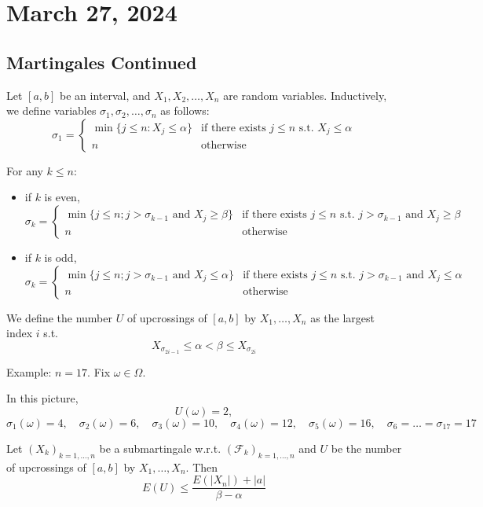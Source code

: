 \section{March 27, 2024}
\subsection{Martingales Continued}


Let $[a, b]$ be an interval, and $X_1, X_2, \ldots, X_n$ are random variables. Inductively, we define variables $\sigma_1, \sigma_2, \ldots, \sigma_n$ as follows:
\[
\sigma_1 = \begin{cases} 
\min \{j \leq n : X_j \leq \alpha \} & \text{if there exists } j \leq n \text{ s.t. } X_j \leq \alpha \\
n & \text{otherwise}
\end{cases}
\]

For any $k \leq n$:
\begin{itemize}
    \item if $k$ is even,
    \[
    \sigma_k = \begin{cases}
    \min \{ j \leq n; j > \sigma_{k-1} \text{ and } X_j \geq \beta \} & \text{if there exists } j \leq n \text{ s.t. } j > \sigma_{k-1} \text{ and } X_j \geq \beta \\
    n & \text{otherwise}
    \end{cases}
    \]
    \item if $k$ is odd,
    \[
    \sigma_k = \begin{cases}
    \min \{ j \leq n; j > \sigma_{k-1} \text{ and } X_j \leq \alpha \} & \text{if there exists } j \leq n \text{ s.t. } j > \sigma_{k-1} \text{ and } X_j \leq \alpha \\
    n & \text{otherwise}
    \end{cases}
    \]
\end{itemize}

We define the number $U$ of upcrossings of $[a, b]$ by $X_1, \ldots, X_n$ as the largest index $i$ s.t.
\[
X_{\sigma_{2i-1}} \leq \alpha < \beta \leq X_{\sigma_{2i}}
\]

Example: $n=17$. Fix $\omega \in \Omega$.



In this picture,
\[
U(\omega) = 2,
\]
\[
\sigma_1(\omega) = 4, \quad \sigma_2(\omega) = 6, \quad \sigma_3(\omega) = 10, \quad \sigma_4(\omega) = 12, \quad \sigma_5(\omega) = 16, \quad \sigma_6 = \ldots = \sigma_{17} = 17
\]

\begin{theorem}
Let $(X_k)_{k=1, \ldots, n}$ be a submartingale w.r.t. $(\mathcal{F}_k)_{k=1, \ldots, n}$ and $U$ be the number of upcrossings of $[a, b]$ by $X_1, \ldots, X_n$. Then
\[
E(U) \leq \frac{E(|X_n|) + |a|}{\beta - \alpha}
\]
\end{theorem}


